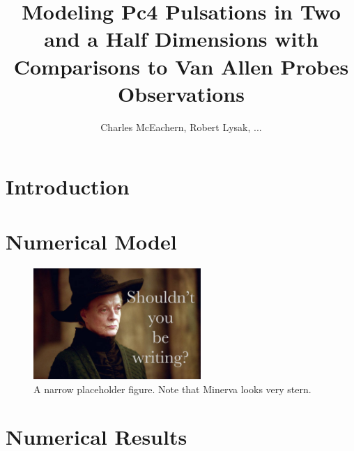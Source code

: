 \documentclass[jgrga]{agutex}
\begin{document}
\title{Modeling Pc4 Pulsations in Two and a Half Dimensions with
       Comparisons to Van Allen Probes Observations}
\author{Charles McEachern, Robert Lysak, ...}


\linespread{2}

\begin{abstract}

\lipsum[1]

\end{abstract}

\begin{article}
\section{Introduction}

\lipsum[2-4]

\section{Numerical Model}

\lipsum[5-6]

\begin{figure}
\begin{center}
\includegraphics[width=15pc]{figures/placeholder.jpg}
\caption{A narrow placeholder figure. Note that Minerva looks very stern. }
\label{fig_placeholder_narrow}
\end{center}
\end{figure}

\lipsum[7]

\section{Numerical Results}


\end{article}
\end{document}

